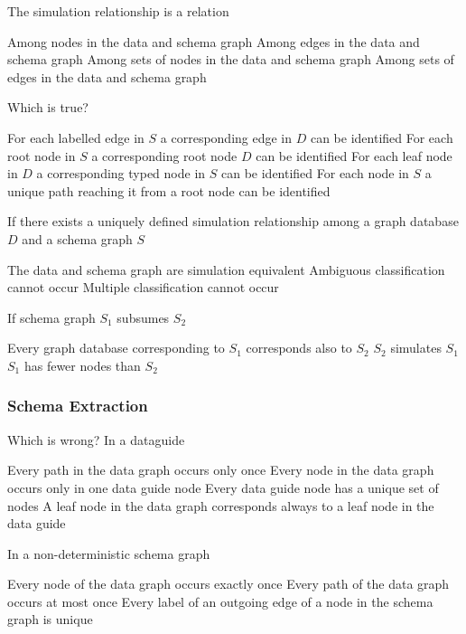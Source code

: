 \documentclass[12pt,a4paper]{exam} %
\begin{document}
\begin{flushleft}
\begin{multicols*}{2}
\begin{questions}
\question The simulation relationship is a relation
\begin{checkboxes}
\CorrectChoice Among nodes in the data and schema graph
\choice Among edges in the data and schema graph
\choice Among sets of nodes in the data and schema graph
\choice Among sets of edges in the data and schema graph
\end{checkboxes}

\question Which is true?
\begin{checkboxes}
\choice For each labelled edge in $S$ a corresponding edge in $D$ can be identified
\choice For each root node in $S$ a corresponding root node $D$ can be identified
\CorrectChoice For each leaf node in $D$ a corresponding typed node in $S$ can be identified
\choice For each node in $S$ a unique path reaching it from a root node can be identified
\end{checkboxes}

\question If there exists a uniquely defined simulation relationship among a graph database $D$ and a schema graph $S$
\begin{checkboxes}
\choice The data and schema graph are simulation equivalent
\CorrectChoice Ambiguous classification cannot occur
\choice Multiple classification cannot occur
\end{checkboxes}

\question If schema graph $S_1$ subsumes $S_2$
\begin{checkboxes}
\choice Every graph database corresponding to $S_1$ corresponds also to $S_2$
\CorrectChoice $S_2$ simulates $S_1$
\choice $S_1$ has fewer nodes than $S_2$
\end{checkboxes}


\subsubsection{Schema Extraction}

\question Which is wrong? In a dataguide
\begin{checkboxes}
\choice Every path in the data graph occurs only once
\CorrectChoice Every node in the data graph occurs only in one data guide node
\choice Every data guide node has a unique set of nodes
\choice A leaf node in the data graph corresponds always to a leaf node in the data guide
\end{checkboxes}

\question In a non-deterministic schema graph
\begin{checkboxes}
\CorrectChoice Every node of the data graph occurs exactly once
\choice Every path of the data graph occurs at most once
\choice Every label of an outgoing edge of a node in the schema graph is unique
\end{checkboxes}




\end{questions}
\end{multicols*}
\end{flushleft}
\end{document}
